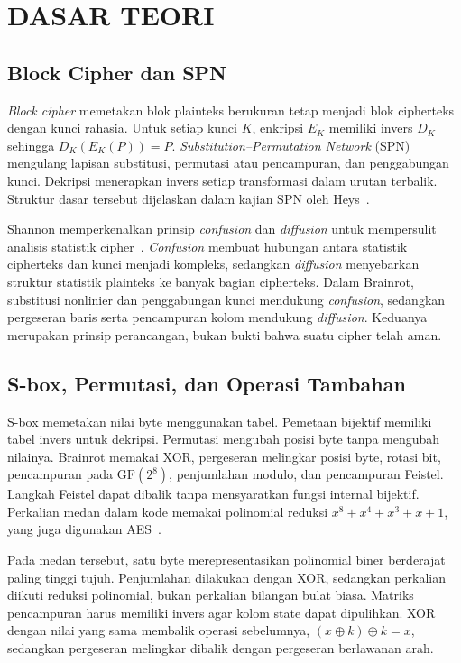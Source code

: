 \chapter{DASAR TEORI}

\section{Block Cipher dan SPN}
\textit{Block cipher} memetakan blok plainteks berukuran tetap menjadi
blok cipherteks dengan kunci rahasia. Untuk setiap kunci $K$, enkripsi
$E_K$ memiliki invers $D_K$ sehingga $D_K(E_K(P))=P$.
\textit{Substitution--Permutation Network} (SPN) mengulang lapisan
substitusi, permutasi atau pencampuran, dan penggabungan kunci. Dekripsi
menerapkan invers setiap transformasi dalam urutan terbalik. Struktur
dasar tersebut dijelaskan dalam kajian SPN oleh Heys~\cite{heys}.

Shannon memperkenalkan prinsip \textit{confusion} dan \textit{diffusion}
untuk mempersulit analisis statistik cipher~\cite{shannon}.
\textit{Confusion} membuat hubungan antara statistik cipherteks dan kunci
menjadi kompleks, sedangkan \textit{diffusion} menyebarkan struktur
statistik plainteks ke banyak bagian cipherteks. Dalam Brainrot,
substitusi nonlinier dan penggabungan kunci mendukung \textit{confusion},
sedangkan pergeseran baris serta pencampuran kolom mendukung
\textit{diffusion}. Keduanya merupakan prinsip perancangan, bukan bukti
bahwa suatu cipher telah aman.

\section{S-box, Permutasi, dan Operasi Tambahan}
S-box memetakan nilai byte menggunakan tabel. Pemetaan bijektif memiliki
tabel invers untuk dekripsi. Permutasi mengubah posisi byte tanpa mengubah
nilainya. Brainrot memakai XOR, pergeseran melingkar posisi byte, rotasi
bit, pencampuran pada $\mathrm{GF}(2^8)$, penjumlahan modulo, dan
pencampuran Feistel. Langkah Feistel dapat dibalik tanpa mensyaratkan
fungsi internal bijektif. Perkalian medan dalam kode memakai
polinomial reduksi $x^8+x^4+x^3+x+1$, yang juga digunakan
AES~\cite{aes}.

Pada medan tersebut, satu byte merepresentasikan polinomial biner
berderajat paling tinggi tujuh. Penjumlahan dilakukan dengan XOR,
sedangkan perkalian diikuti reduksi polinomial, bukan perkalian bilangan
bulat biasa. Matriks pencampuran harus memiliki invers agar kolom state
dapat dipulihkan. XOR dengan nilai yang sama membalik operasi sebelumnya,
$(x\oplus k)\oplus k=x$, sedangkan pergeseran melingkar dibalik dengan pergeseran
berlawanan arah.

